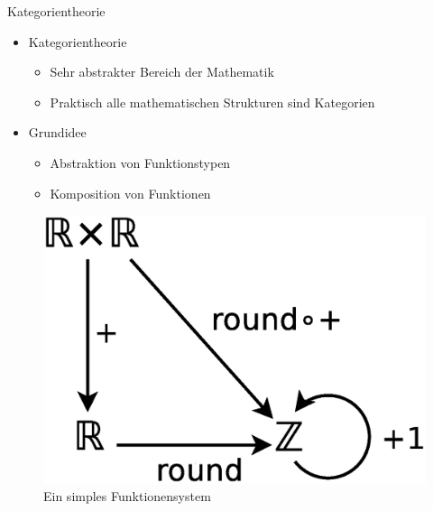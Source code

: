\documentclass{beamer}
\begin{document}
\begin{frame}{Kategorientheorie}
  \begin{itemize}
  \item Kategorientheorie
    \begin{itemize}
    \item Sehr abstrakter Bereich der Mathematik
    \item Praktisch alle mathematischen Strukturen sind Kategorien
    \end{itemize}
  \item Grundidee
    \begin{itemize}
    \item Abstraktion von Funktionstypen
    \item Komposition von Funktionen
    \end{itemize}
  \end{itemize}
  \begin{figure}
    \centering
    \includegraphics[scale=0.3]{images/cat_funs}
    \caption{Ein simples Funktionensystem}
  \end{figure}
\end{frame}
\end{document}
